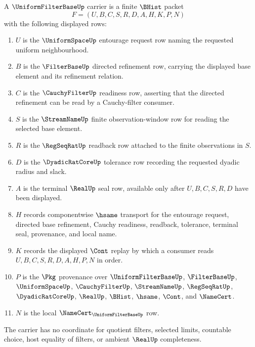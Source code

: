 \begin{definition}
\label{def:uniform-filter-base-carrier}
A $\UniformFilterBaseUp$ carrier is a finite $\BHist$ packet
$$
F=(U,B,C,S,R,D,A,H,K,P,N)
$$
with the following displayed rows:
\begin{enumerate}
\item $U$ is the $\UniformSpaceUp$ entourage request row naming the requested uniform neighbourhood.
\item $B$ is the $\FilterBaseUp$ directed refinement row, carrying the displayed base element and its refinement relation.
\item $C$ is the $\CauchyFilterUp$ readiness row, asserting that the directed refinement can be read by a Cauchy-filter consumer.
\item $S$ is the $\StreamNameUp$ finite observation-window row for reading the selected base element.
\item $R$ is the $\RegSeqRatUp$ readback row attached to the finite observations in $S$.
\item $D$ is the $\DyadicRatCoreUp$ tolerance row recording the requested dyadic radius and slack.
\item $A$ is the terminal $\RealUp$ seal row, available only after $U,B,C,S,R,D$ have been displayed.
\item $H$ records componentwise $\hsame$ transport for the entourage request, directed base refinement, Cauchy readiness, readback, tolerance, terminal seal, provenance, and local name.
\item $K$ records the displayed $\Cont$ replay by which a consumer reads $U,B,C,S,R,D,A,H,P,N$ in order.
\item $P$ is the $\Pkg$ provenance over $\UniformFilterBaseUp$, $\FilterBaseUp$, $\UniformSpaceUp$, $\CauchyFilterUp$, $\StreamNameUp$, $\RegSeqRatUp$, $\DyadicRatCoreUp$, $\RealUp$, $\BHist$, $\hsame$, $\Cont$, and $\NameCert$.
\item $N$ is the local $\NameCert_{\UniformFilterBaseUp}$ row.
\end{enumerate}
The carrier has no coordinate for quotient filters, selected limits, countable choice, host equality of filters, or ambient $\RealUp$ completeness.
\end{definition}

